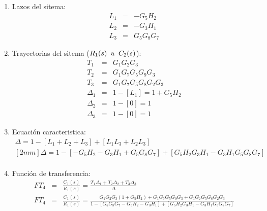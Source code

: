 \documentclass[12pt]{article}
\begin{document}
\begin{enumerate}
  \item Lazos del sitema:
    \begin{eqnarray*}
      L_{1} &=& - G_{5}H_{2} \\
      L_{2} &=& - G_{3}H_{1} \\
      L_{3} &=& G_{5}G_{8}G_{7}
    \end{eqnarray*}
  \item Trayectorias del sitema ($R_{1}(s) \hspace{2mm} \text{a} \hspace{2mm} C_{2}(s)$):
    \begin{eqnarray*}
      T_{1} &=& G_{1}G_{2}G_{3} \\
      T_{2} &=& G_{1}G_{7}G_{5}G_{9}G_{3} \\
      T_{3} &=& G_{1}G_{7}G_{5}G_{8}G_{2}G_{3} \\
      \Delta_{1} &=& 1-[L_{1}]=1+G_{5}H_{2} \\
      \Delta_{2} &=& 1-[0]=1 \\
      \Delta_{3} &=& 1-[0]=1
    \end{eqnarray*}
  \item Ecuaci\'on caracteristica:
    \begin{eqnarray*}
      \Delta = 1-[L_{1}+L_{2}+L_{3}]+[L_{1}L_{3}+L_{2}L_{3}] \\ [2mm]
      \Delta = 1-[-G_{5}H_{2}-G_{3}H_{1}+G_{5}G_{8}G_{7}]+[G_{5}H_{2}G_{3}H_{1}-G_{3}H_{1}G_{5}G_{8}G_{7}]\\
    \end{eqnarray*}
  \item Funci\'on de transferencia:
    \begin{eqnarray*}
      FT_{4} &=& \frac{C_{1}(s)}{R_{1}(s)}=\frac{T_{1}\Delta_{1}+T_{2}\Delta_{2}+T_{3}\Delta_{3}}{\Delta} \\[5mm]
      FT_{4} &=& \frac{C_{1}(s)}{R_{1}(s)} = \frac{G_{1}G_{2}G_{3}(1+G_{5}H_{2})+G_{1}G_{7}G_{5}G_{9}G_{3}+G_{1}G_{7}G_{5}G_{8}G_{2}G_{3}}{1-[G_{5}G_{8}G_{7}-G_{5}H_{2}-G_{3}H_{1}]+[G_{5}H_{2}G_{3}H_{1}-G_{3}H_{1}G_{5}G_{8}G_{7}]} \\
    \end{eqnarray*}
\end{enumerate}

\newpage
\end{document}
